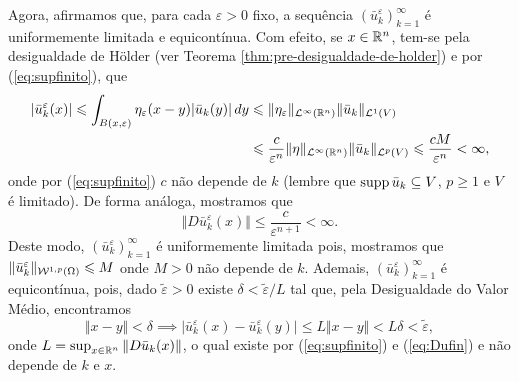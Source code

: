\begin{prf}
    Agora, afirmamos que, para cada $\varepsilon > 0$ fixo, a sequência $(\bar u_k^\varepsilon)_{k=1}^\infty$ é uniformemente limitada e equicontínua.
    Com efeito, se $x \in \mathbb{R}^n$, tem-se pela desigualdade de Hölder (ver Teorema \ref{thm:pre-desigualdade-de-holder}) e por (\ref{eq:supfinito}), que
    \begin{equation} \label{eq:ufin}
        \begin{aligned}
            |\bar u_k^\varepsilon(x)| \leqslant \int_{B(x,\varepsilon)} \eta_\varepsilon (x - y) |\bar u_k(y)| \,dy &\leqslant \Vert \eta_\varepsilon \Vert_{\mathcal{L}^\infty(\mathbb{R}^n)} \Vert \bar u_k \Vert_{\mathcal{L}^1(V)}\\ 
            &\leqslant \frac{c}{\varepsilon^n} \Vert \eta \Vert_{\mathcal{L}^\infty(\mathbb{R}^n)} \Vert \bar u_k \Vert_{\mathcal{L}^p(V)} \leqslant \frac{cM}{\varepsilon^n} < \infty,
        \end{aligned}
    \end{equation}
    onde por (\ref{eq:supfinito}) $c$ não depende de $k$ (lembre que $\mathrm{supp}\, \bar u_k \subseteq V$, $p \geqslant 1$ e $V$ é limitado). De forma análoga, mostramos que
    \begin{equation} \label{eq:Dufin}
        \Vert D\bar u_k^\varepsilon(x) \Vert  \leqslant \frac{c}{\varepsilon^{n+1}} < \infty.
    \end{equation}
    Deste modo, $(\bar u_k^\varepsilon)_{k=1}^\infty$ é uniformemente limitada pois, mostramos que $\Vert \bar u_k^\varepsilon \Vert_{\mathcal{W}^{1,p}(\Omega)}\leqslant M$ onde $M > 0$ não depende de $k$.
    Ademais, $(\bar u_k^\varepsilon)_{k=1}^\infty$ é equicontínua, pois, dado $\tilde\varepsilon > 0$ existe $\delta < \tilde\varepsilon / L$ tal que, pela Desigualdade do Valor Médio, encontramos
    \[
        \Vert x - y \Vert < \delta \implies |\bar u_k^\varepsilon(x) - \bar u_k^\varepsilon(y)| \leqslant L \Vert x - y \Vert < L \delta < \tilde\varepsilon,
    \]
    onde $L = \sup_{x \in \mathbb{R}^n} \Vert D\bar u_k(x) \Vert$, o qual existe por (\ref{eq:supfinito}) e (\ref{eq:Dufin}) e não depende de $k$ e $x$.


\end{prf}
